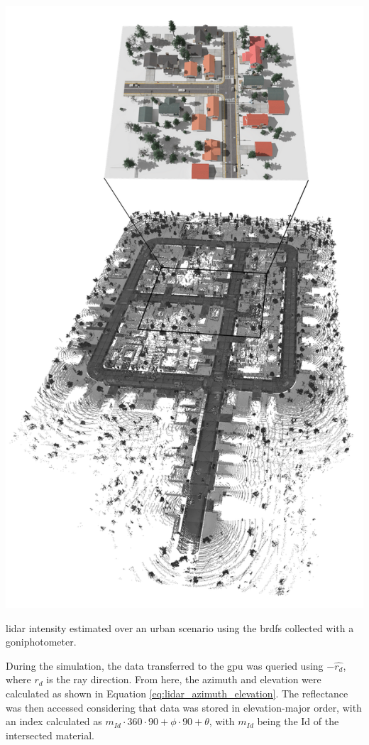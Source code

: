 \begin{marginfigure}[-2.0cm]
    \centering
    \includegraphics[width=\linewidth]{figs/lidar_intensity/material_database_intensity_results.png}
    \caption{\acrshort{lidar} intensity estimated over an urban scenario using the \acrshort{brdf}s collected with a goniphotometer.}
	\label{fig:lidar_material_database_intensity_result}
\end{marginfigure}
During the simulation, the data transferred to the \acrshort{gpu} was queried using $-\widehat{r_d}$, where $r_d$ is the ray direction. From here, the azimuth and elevation were calculated as shown in Equation \ref{eq:lidar_azimuth_elevation}. The reflectance was then accessed considering that data was stored in elevation-major order, with an index calculated as $m_{\textit{Id}} \cdot 360 \cdot 90 + \phi \cdot 90 + \theta$, with $m_{\textit{Id}}$ being the Id of the intersected material.
